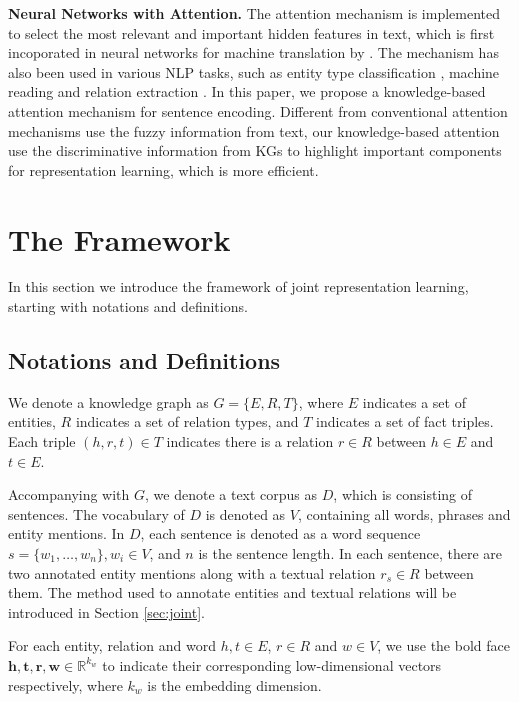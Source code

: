 \documentclass[11pt,a4paper]{article}
\begin{document}
\textbf{Neural Networks with Attention.} The attention mechanism is implemented to select the most relevant and important hidden features in text, which is first incoporated in neural networks for machine translation by . The mechanism has also been used in various NLP tasks, such as entity type classification \cite{shimaoka2016attentive}, machine reading \cite{dhingra2016gated,sordoni2016iterative} and relation extraction \cite{lin2016neural}. In this paper, we propose a knowledge-based attention mechanism for sentence encoding. Different from conventional attention mechanisms use the fuzzy information from text, our knowledge-based attention use the discriminative information from KGs to highlight important components for representation learning, which is more efficient.


\section{The Framework}
In this section we introduce the framework of joint representation learning, starting with notations and definitions.

\subsection{Notations and Definitions}

We denote a knowledge graph as $G = \{E, R, T\}$, where $E$ indicates a set of entities, $R$ indicates a set of relation types, and $T$ indicates a set of fact triples. Each triple $(h, r, t) \in T$ indicates there is a relation $r \in R$ between $h \in E$ and $t \in E$.

Accompanying with $G$, we denote a text corpus as $D$, which is consisting of sentences. The vocabulary of $D$ is denoted as $V$, containing all words, phrases and entity mentions. In $D$, each sentence is denoted as a word sequence $s = \{w_1, \ldots, w_n\}, w_i \in V$, and $n$ is the sentence length. In each sentence, there are two annotated entity mentions along with a textual relation $r_s \in R$ between them. The method used to annotate entities and textual relations will be introduced in Section \ref{sec:joint}. 

For each entity, relation and word $h, t \in E$, $r \in R$ and $w \in V$, we use the bold face $\mathbf{h}, \mathbf{t}, \mathbf{r}, \mathbf{w} \in \mathbb{R}^{k_w}$ to indicate their corresponding low-dimensional vectors respectively, where $k_w$ is the embedding dimension.
\end{document}
